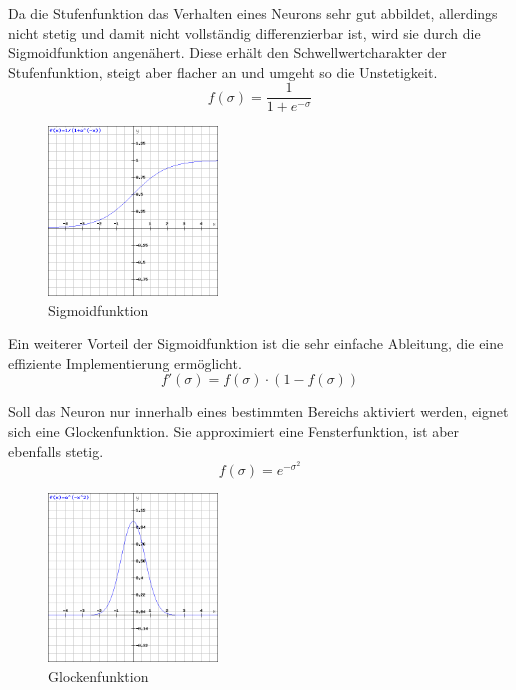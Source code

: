 Da die Stufenfunktion das Verhalten eines Neurons sehr gut abbildet, allerdings nicht stetig und damit nicht vollständig differenzierbar ist, wird sie durch die Sigmoidfunktion angenähert. Diese erhält den Schwellwertcharakter der Stufenfunktion, steigt aber flacher an und umgeht so die Unstetigkeit.
\begin{equation}
f(\sigma) = \frac{1}{1+e^{-\sigma}}
\end{equation}
\begin{figure}[h]
\centering
\includegraphics[width=0.4\textwidth]{pictures/sigmoid.png}
\caption{Sigmoidfunktion}

\end{figure}

Ein weiterer Vorteil der Sigmoidfunktion ist die sehr einfache Ableitung, die eine effiziente Implementierung ermöglicht.
\begin{equation}
f'(\sigma) = f(\sigma)\cdot (1- f(\sigma))
\end{equation}

Soll das Neuron nur innerhalb eines bestimmten Bereichs aktiviert werden, eignet sich eine Glockenfunktion. Sie approximiert eine Fensterfunktion, ist aber ebenfalls stetig.
\begin{equation}
f(\sigma) = e^{-\sigma^2}
\end{equation}
\begin{figure}[h]
\centering
\includegraphics[width=0.4\textwidth]{pictures/glocke.png}
\caption{Glockenfunktion}
\end{figure}

